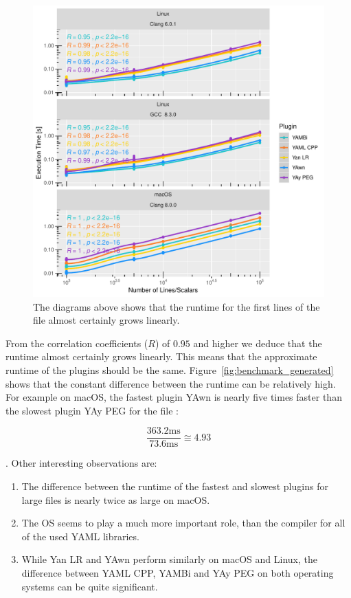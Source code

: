 \begin{figure}[H]
  \centering
    \includegraphics[width=\textwidth]{Figures/BenchmarkResultGeneratedAbove1000}
  \caption{The diagrams above shows that the runtime for the first lines of the file \FileGeneratedHundredThousand{} almost certainly grows linearly.}
  \label{fig:benchmark_results_generated_above_1000}
\end{figure}

From the correlation coefficients ($R$) of $0.95$ and higher we deduce that the runtime almost certainly grows linearly. This means that the approximate runtime of the plugins should be the same. Figure~\ref{fig:benchmark_generated} shows that the constant difference between the runtime can be relatively high. For example on macOS, the fastest plugin YAwn is nearly five times faster than the slowest plugin YAy PEG for the file \FileGenerated{}:

\begin{equation}
  \frac{363.2\text{ms}}{73.6\text{ms}} ≅ 4.93
  \label{eq:benchmark_difference}
\end{equation}

. Other interesting observations are:

\begin{enumerate}
  \item The difference between the runtime of the fastest and slowest plugins for large files is nearly twice as large on macOS.

  \item The OS seems to play a much more important role, than the compiler for all of the used YAML libraries.

  \item While Yan LR and YAwn perform similarly on macOS and Linux, the difference between YAML CPP, YAMBi and YAy PEG on both operating systems can be quite significant.
\end{enumerate}

